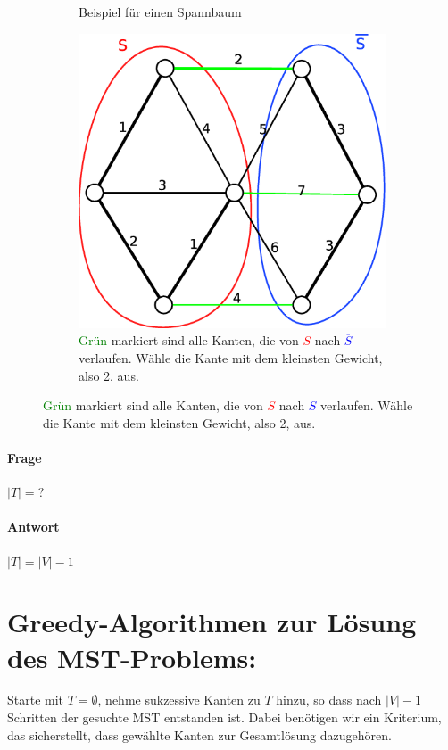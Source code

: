 \begin{figure}[H]
\begin{subfigure}[H]{0.3\textwidth}
	\caption{Beispiel für einen Spannbaum}
	\label{fig:Spannbaum2}
\end{subfigure}
\begin{subfigure}[H]{0.3\textwidth}
	\includegraphics[width=\linewidth]{19/Grafik/Schnittlemma1}
	\caption{\textcolor{green}{Grün} markiert sind alle Kanten, die von \textcolor{red}{$S$} nach \textcolor{blue}{$\overline{S}$} verlaufen. Wähle die Kante mit dem kleinsten Gewicht, also 2, aus.}
	\label{fig:Spannbaum3}
\end{subfigure}
\end{figure}

\paragraph{Frage} $|T|= $?
\paragraph{Antwort} $|T| = |V|-1$
\section{Greedy-Algorithmen zur Lösung des MST-Problems:}
Starte mit $T=\emptyset$, nehme sukzessive Kanten zu $T$ hinzu, so dass nach $|V|-1$ Schritten der gesuchte MST entstanden ist. 
Dabei benötigen wir ein Kriterium, das sicherstellt, dass gewählte Kanten zur Gesamtlösung dazugehören.
